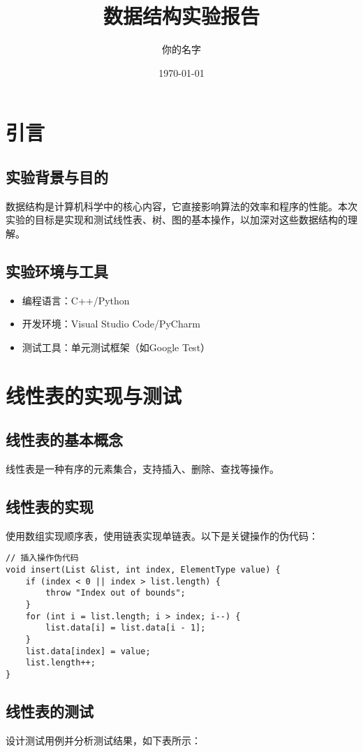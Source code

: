 \documentclass{article}
\title{数据结构实验报告}
\author{你的名字}
\date{\today}
\begin{document}
\maketitle

\section{引言}
\subsection{实验背景与目的}
数据结构是计算机科学中的核心内容，它直接影响算法的效率和程序的性能。本次实验的目标是实现和测试线性表、树、图的基本操作，以加深对这些数据结构的理解。

\subsection{实验环境与工具}
\begin{itemize}
    \item 编程语言：C++/Python
    \item 开发环境：Visual Studio Code/PyCharm
    \item 测试工具：单元测试框架（如Google Test）
\end{itemize}

\section{线性表的实现与测试}
\subsection{线性表的基本概念}
线性表是一种有序的元素集合，支持插入、删除、查找等操作。

\subsection{线性表的实现}
使用数组实现顺序表，使用链表实现单链表。以下是关键操作的伪代码：

\begin{verbatim}
// 插入操作伪代码
void insert(List &list, int index, ElementType value) {
    if (index < 0 || index > list.length) {
        throw "Index out of bounds";
    }
    for (int i = list.length; i > index; i--) {
        list.data[i] = list.data[i - 1];
    }
    list.data[index] = value;
    list.length++;
}
\end{verbatim}

\subsection{线性表的测试}
设计测试用例并分析测试结果，如下表所示：
\end{document}
